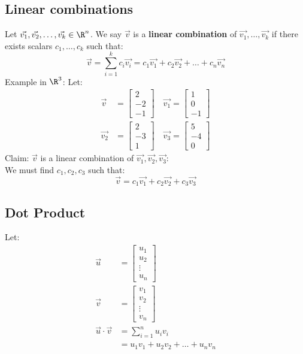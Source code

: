 \documentclass[letterpaper, 12pt]{math}
\begin{document}
\subsection*{Linear combinations}
Let \( \vec{v_{1}},\vec{v_{2}},\dots,\vec{v_{k}}\in\R^n \). We say
\( \vec{v} \) is a \textbf{linear combination} of
\( \vec{v_{1}},\dots,\vec{v_{k}} \) if there exists scalars
\( c_{1},\dots,c_{k} \) such that:
\[ \vec{v} = \sum_{i=1}^{k}c_{i}\vec{v_{i}} =
  c_{1}\vec{v_{1}}+c_{2}\vec{v_{2}}+\dots+c_{n}\vec{v_{n}} \]
Example in \( \R^{3} \):
Let:
\begin{align*}
  \vec{v} &=
    \begin{bmatrix}
      2 \\ -2 \\ -1
    \end{bmatrix} \quad
  \vec{v_{1}} =
    \begin{bmatrix}
      1 \\ 0 \\ -1
    \end{bmatrix} \\
  \vec{v_{2}} &=
    \begin{bmatrix}
      2 \\ -3 \\ 1
    \end{bmatrix} \quad
  \vec{v_{3}} =
    \begin{bmatrix}
      5 \\ -4 \\ 0
    \end{bmatrix}
\end{align*}
Claim: \( \vec{v} \) is a linear combination of
\( \vec{v_{1}},\vec{v_{2}},\vec{v_{3}} \): \\
We must find \( c_{1},c_{2},c_{3} \) such that:
\[ \vec{v} = c_{1}\vec{v_{1}}+c_{2}\vec{v_{2}}+c_{3}\vec{v_{3}} \]

\subsection*{Dot Product}
Let:
\begin{align*}
  \vec{u} &=
    \begin{bmatrix}
      u_{1} \\ u_{2} \\ \vdots \\ u_{n}
    \end{bmatrix} \\
  \vec{v} &=
    \begin{bmatrix}
      v_{1} \\ v_{2} \\ \vdots \\ v_{n}
    \end{bmatrix} \\
  \vec{u}\cdot\vec{v} &= \sum_{i=1}^{n}u_{i}v_{i} \\
  &= u_{1}v_{1}+u_{2}v_{2}+\dots+u_{n}v_{n}
\end{align*}
\end{document}
